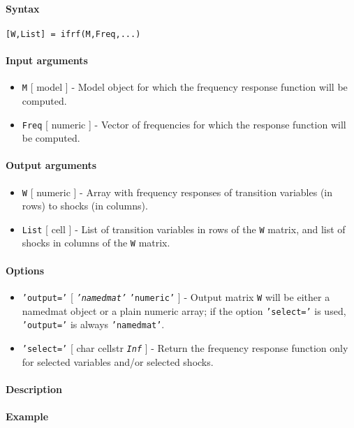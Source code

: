 


	\paragraph{Syntax}\label{syntax}

\begin{verbatim}
[W,List] = ifrf(M,Freq,...)
\end{verbatim}

\paragraph{Input arguments}\label{input-arguments}

\begin{itemize}
\item
  \texttt{M} {[} model {]} - Model object for which the frequency
  response function will be computed.
\item
  \texttt{Freq} {[} numeric {]} - Vector of frequencies for which the
  response function will be computed.
\end{itemize}

\paragraph{Output arguments}\label{output-arguments}

\begin{itemize}
\item
  \texttt{W} {[} numeric {]} - Array with frequency responses of
  transition variables (in rows) to shocks (in columns).
\item
  \texttt{List} {[} cell {]} - List of transition variables in rows of
  the \texttt{W} matrix, and list of shocks in columns of the \texttt{W}
  matrix.
\end{itemize}

\paragraph{Options}\label{options}

\begin{itemize}
\item
  \texttt{'output='} {[} \emph{\texttt{'namedmat'}} \textbar{}
  \texttt{'numeric'} {]} - Output matrix \texttt{W} will be either a
  namedmat object or a plain numeric array; if the option
  \texttt{'select='} is used, \texttt{'output='} is always
  \texttt{'namedmat'}.
\item
  \texttt{'select='} {[} char \textbar{} cellstr \textbar{}
  \emph{\texttt{Inf}} {]} - Return the frequency response function only
  for selected variables and/or selected shocks.
\end{itemize}

\paragraph{Description}\label{description}

\paragraph{Example}\label{example}



